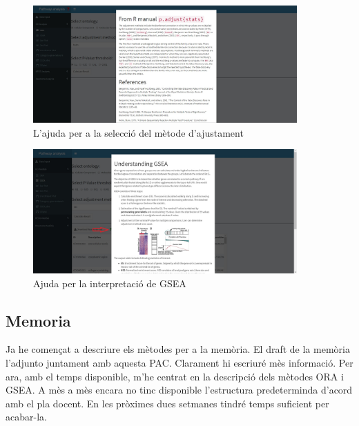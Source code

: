 \documentclass[]{article}
\begin{document}
\begin{figure}[H]
\centering
\includegraphics[width=0.9\textwidth]{Help_pAdjustMethod.jpg} 
\caption{L'ajuda per a la selecció del mètode d'ajustament}
\end{figure}


\begin{figure}[H]
\centering
\includegraphics[width=0.9\textwidth]{Help_GSEA_output.jpg} 
\caption{Ajuda per la interpretació de GSEA}
\end{figure}

\subsection{Memoria}
Ja he començat a descriure els mètodes per a la memòria. El draft de la memòria l'adjunto juntament amb aquesta PAC. Clarament hi escriuré mès informació. Per ara, amb el temps disponible, m'he centrat en la descripció dels mètodes ORA i GSEA. A mès a mès encara no tinc disponible l'estructura predeterminda d'acord amb el pla docent. En les pròximes dues setmanes tindré temps suficient per acabar-la.
\end{document}
